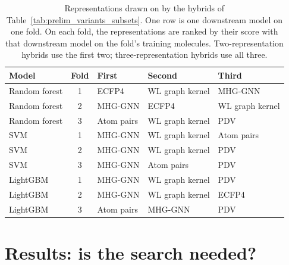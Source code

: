 \begin{table}[htbp]
\centering
\small
\begin{tabular}{@{}lclll@{}}
\toprule
Model & Fold & First & Second & Third \\
\midrule
Random forest & 1 & ECFP4 & WL graph kernel & MHG-GNN \\
Random forest & 2 & MHG-GNN & ECFP4 & WL graph kernel \\
Random forest & 3 & Atom pairs & WL graph kernel & PDV \\
SVM & 1 & MHG-GNN & WL graph kernel & Atom pairs \\
SVM & 2 & MHG-GNN & WL graph kernel & PDV \\
SVM & 3 & MHG-GNN & Atom pairs & PDV \\
LightGBM & 1 & MHG-GNN & WL graph kernel & PDV \\
LightGBM & 2 & MHG-GNN & WL graph kernel & ECFP4 \\
LightGBM & 3 & Atom pairs & MHG-GNN & PDV \\
\bottomrule
\end{tabular}
\caption[Representations drawn on by the two- and three-representation hybrids.]{Representations drawn on by the hybrids of Table~\ref{tab:prelim_variants_subsets}. One row is one downstream model on one fold. On each fold, the representations are ranked by their score with that downstream model on the fold's training molecules. Two-representation hybrids use the first two; three-representation hybrids use all three.}
\label{tab:prelim_variants_subset_reps}
\end{table}

\section{Results: is the search needed?}\label{sec:method:results_searchspace}

